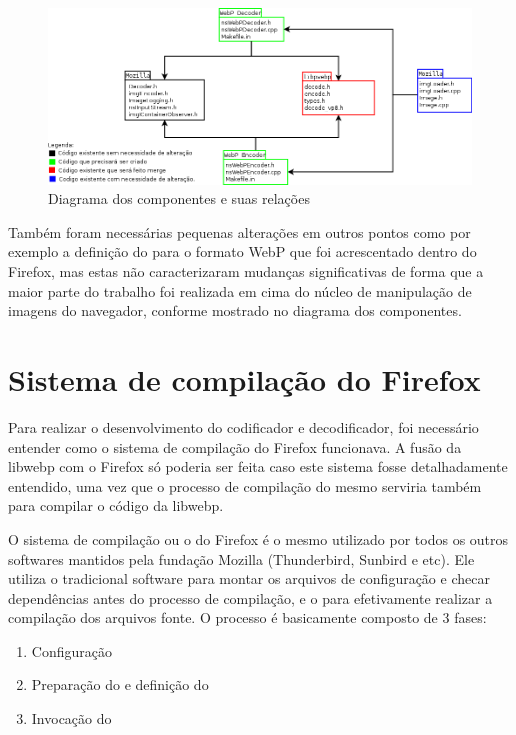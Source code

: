 \documentclass[espaco=simples,appendix=Name]{abnt}
\begin{document}
\begin{figure}[h]
  \centering
    \includegraphics[scale=0.45]{Arquitetura.png}
  \caption{Diagrama dos componentes e suas relações}
\end{figure}

Também foram necessárias pequenas alterações em outros pontos como por exemplo a definição do  para o formato WebP que foi acrescentado dentro do Firefox, mas estas não caracterizaram mudanças significativas de forma que a maior parte do trabalho foi realizada em cima do núcleo de manipulação de imagens do navegador, conforme mostrado no diagrama dos componentes.

\section{Sistema de compilação do Firefox}

Para realizar o desenvolvimento do codificador e decodificador, foi necessário entender como o sistema de compilação do Firefox funcionava. A fusão da libwebp com o Firefox só poderia ser feita caso este sistema fosse detalhadamente entendido, uma vez que o processo de compilação do mesmo serviria também para compilar o código da libwebp.

O sistema de compilação ou o  do Firefox é o mesmo utilizado por todos os outros softwares mantidos pela fundação Mozilla (Thunderbird, Sunbird e etc). Ele utiliza o tradicional software  para montar os arquivos de configuração e checar dependências antes do processo de compilação, e o  para efetivamente realizar a compilação dos arquivos fonte. O processo é basicamente composto de 3 fases:
\begin{enumerate}
        \item Configuração 
        \item Preparação do  e definição do  
        \item Invocação do 
\end{enumerate}
\end{document}
